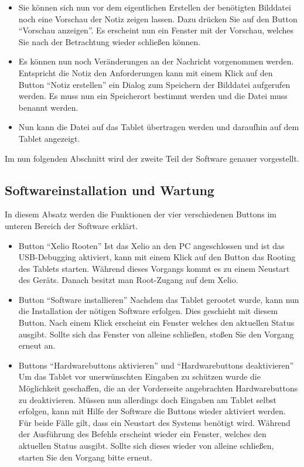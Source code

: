 \begin{flushleft}
\begin{itemize}
  \item Sie können sich nun vor dem eigentlichen Erstellen der benötigten Bilddatei noch eine Vorschau der Notiz zeigen lassen. Dazu drücken   
        Sie auf den Button ``Vorschau anzeigen''. Es erscheint nun ein Fenster mit der Vorschau, welches Sie nach der Betrachtung wieder schließen können.
        
  \item Es können nun noch Veränderungen an der Nachricht vorgenommen werden. Entspricht die Notiz den Anforderungen kann mit einem Klick 	
	auf den Button ``Notiz erstellen'' ein Dialog zum Speichern der Bilddatei aufgerufen werden. Es muss nun ein Speicherort bestimmt werden und die Datei muss benannt werden. 
	
  \item Nun kann die Datei auf das Tablet übertragen werden und daraufhin auf dem Tablet angezeigt. 
\end{itemize}

Im nun folgenden Abschnitt wird der zweite Teil der Software genauer vorgestellt.

\subsection{Softwareinstallation und Wartung}
In diesem Absatz werden die Funktionen der vier verschiedenen Buttons im unteren Bereich der Software erklärt.

\begin{itemize}
  \item Button ``Xelio Rooten''
    \subitem Ist das Xelio an den PC angeschlossen und ist das USB-Debugging aktiviert, kann mit einem Klick auf den Button das Rooting des 	
	     Tablets starten. Während dieses Vorgangs kommt es zu einem Neustart des Geräts. Danach besitzt man Root-Zugang auf dem Xelio.
	     
  \item Button ``Software installieren''
    \subitem Nachdem das Tablet gerootet wurde, kann nun die Installation der nötigen Software erfolgen. Dies geschieht mit diesem Button. 	
	     Nach einem Klick erscheint ein Fenster welches den aktuellen Status ausgibt. Sollte sich das Fenster von alleine schließen, stoßen Sie den Vorgang erneut an. 
	 
  \item Buttons ``Hardwarebuttons aktivieren'' und ``Hardwarebuttons deaktivieren''
    \subitem Um das Tablet vor unerwünschten Eingaben zu schützen wurde die Möglichkeit geschaffen, die an der Vorderseite angebrachten 	
             Hardwarebuttons zu deaktivieren. Müssen nun allerdings doch Eingaben am Tablet selbst erfolgen, kann mit Hilfe der Software die Buttons wieder aktiviert werden. Für beide Fälle gilt, dass ein Neustart des Systems benötigt wird. Während der Ausführung des Befehls erscheint wieder ein Fenster, welches den aktuellen Status ausgibt. Sollte sich dieses wieder von alleine schließen, starten Sie den Vorgang bitte erneut.
\end{itemize}



\end{flushleft}
